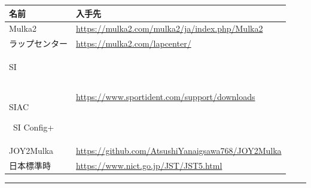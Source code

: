 \documentclass[a4paper,10pt]{ltjsarticle}
\DeclareRobustCommand{\tg}[2]{{\colorbox{#1}{\color{white}\sffamily\bfseries\scriptsize\strut #2}}}
\DeclareRobustCommand{\tSI}{\tg{cSI}{SI}}
\DeclareRobustCommand{\tSIAC}{\tg{cSIAC}{SIAC}}
\newcommand{\hd}[1]{\textbf{#1}}
\begin{document}
\vspace{3mm}

\begin{center}
\small
\begin{tabular}{@{}P{40mm}P{108mm}@{}}
\toprule
\hd{名前} & \hd{入手先} \\
\midrule
Mulka2 & \url{https://mulka2.com/mulka2/ja/index.php/Mulka2} \\
ラップセンター & \url{https://mulka2.com/lapcenter/} \\
\tSI\ \tSIAC\ SI Config+ & \url{https://www.sportident.com/support/downloads} \\
JOY2Mulka & \url{https://github.com/AtsushiYanaigsawa768/JOY2Mulka} \\
日本標準時 & \url{https://www.nict.go.jp/JST/JST5.html} \\
\bottomrule
\end{tabular}
\end{center}


\vspace{6mm}
\noindent\textcolor{rulec}{\rule{\textwidth}{0.4pt}}\par
\vspace{2mm}
\end{document}
